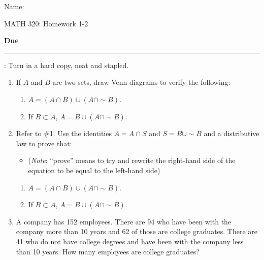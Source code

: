 \documentclass{article}
\newcommand{\blankul}[1]{\rule[-1.5mm]{#1}{0.15mm}}	%
\newcommand{\comp}{{\sim}}			%
\begin{document}
\hspace{375pt}Name:

\begin{center}
{\Huge MATH 320: Homework 1-2}
\end{center}

\bigskip\bigskip

{\large \textbf{Due} \blankul{4cm}: Turn in a hard copy, neat and stapled.}\bigskip


\begin{enumerate}
    \item If $A$ and $B$ are two sets, draw Venn diagrams to verify the following:%
    \begin{enumerate}
        \item $A = (A \cap B) \cup (A \cap \comp B)$.
        \item If $B \subset A$, $A = B \cup (A \cap \comp B)$. 
    \end{enumerate}\bigskip
    
    \item Refer to \#1. Use the identities $A = A \cap S$ and $S = B \cup \comp B$ and a distributive law to prove that:\smallskip%
    \begin{itemize}
        \item[] (\textit{Note}: ``prove'' means to try and rewrite the right-hand side of the equation to be equal to the left-hand side)
    \end{itemize}\smallskip
    \begin{enumerate}
        \item $A = (A \cap B) \cup (A \cap \comp B)$.
        \item If $B \subset A$, $A = B \cup (A \cap \comp B)$. 
    \end{enumerate}\bigskip
    
    \item A company has 152 employees. There are 94 who have been with the company more than 10 years and 62 of those are college graduates. There are 41 who do not have college degrees and have been with the company less than 10 years. How many employees are college graduates?\bigskip%
    

\end{enumerate}
\end{document}
